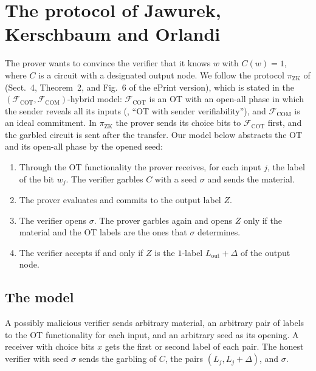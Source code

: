 \chapter{The protocol of Jawurek, Kerschbaum and Orlandi}
\label{chap:jko}

The prover wants to convince the verifier that it knows $w$ with $C(w) = 1$, where $C$ is a
circuit with a designated output node. We follow the protocol $\pi_{\mathrm{ZK}}$ of \cite{JKO13}
(Sect.~4, Theorem~2, and Fig.~6 of the ePrint version), which is stated in the
$(\mathcal{F}_{\mathrm{COT}}, \mathcal{F}_{\mathrm{COM}})$-hybrid model: $\mathcal{F}_{\mathrm{COT}}$
is an OT with an open-all phase in which the sender reveals all its inputs (\cite[Fig.~3]{JKO13},
``OT with sender verifiability''), and $\mathcal{F}_{\mathrm{COM}}$ is an ideal commitment. In
$\pi_{\mathrm{ZK}}$ the prover sends its choice bits to $\mathcal{F}_{\mathrm{COT}}$ first, and the
garbled circuit is sent after the transfer. Our model below abstracts the OT and its open-all phase
by the opened seed:
\begin{enumerate}
  \item Through the OT functionality the prover receives, for each input $j$, the label of the
  bit $w_j$. The verifier garbles $C$ with a seed $\sigma$ and sends the material.
  \item The prover evaluates and commits to the output label $Z$.
  \item The verifier opens $\sigma$. The prover garbles again and opens $Z$ only if the material
  and the OT labels are the ones that $\sigma$ determines.
  \item The verifier accepts if and only if $Z$ is the $1$-label $L_{\mathrm{out}} + \Delta$ of the
  output node.
\end{enumerate}

\section{The model}

\begin{definition}
  \label{def:verifier-msg}
  \leanok
  A possibly malicious verifier sends arbitrary material, an arbitrary pair of labels to the OT
  functionality for each input, and an arbitrary seed as its opening. A receiver with choice bits
  $x$ gets the first or second label of each pair. The honest verifier with seed $\sigma$ sends
  the garbling of $C$, the pairs $(L_j, L_j + \Delta)$, and $\sigma$.
\end{definition}

